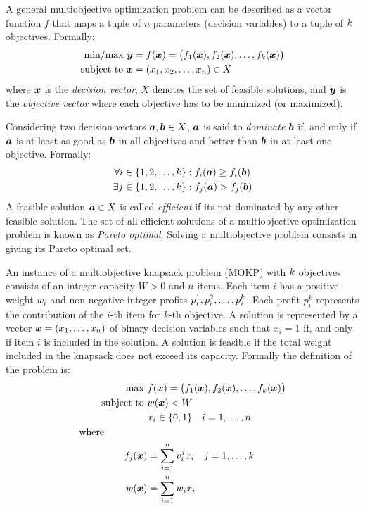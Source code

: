 A general multiobjective optimization problem can be described as a vector
function $f$ that maps a tuple of $n$ parameters (decision variables) to a tuple
of $k$ objectives.
Formally:
\begin{align*}
  \text{min/max} ~ \boldsymbol{y} &= f(\boldsymbol{x}) = 
    \big(f_1(\boldsymbol{x})
    ,f_2(\boldsymbol{x})
    ,\ldots
    ,f_{k}(\boldsymbol{x})\big) \\
  \text{subject to} ~ \boldsymbol{x} & = (x_1, x_2, \ldots, x_n) \in X
\end{align*}
where $\boldsymbol{x}$ is the \emph{decision vector}, $X$ denotes the set
of feasible solutions, and $\boldsymbol{y}$ is the \emph{objective vector} where
each objective has to be minimized (or maximized).

Considering two decision vectors $\boldsymbol{a}, \boldsymbol{b} \in X$, $\boldsymbol{a}$ is said to
\emph{dominate} $\boldsymbol{b}$ if, and only if $\boldsymbol{a}$ is at least as good as $\boldsymbol{b}$
in all objectives and better than $\boldsymbol{b}$ in at least one objective.
Formally:
\begin{align*}
    \forall i &\in \{1, 2, \ldots, k\}: f_i(\boldsymbol{a}) \geq f_i(\boldsymbol{b}) \\
    \exists j &\in \{1, 2, \ldots, k\}: f_j(\boldsymbol{a}) > f_j(\boldsymbol{b})
\end{align*}
A feasible solution $\boldsymbol{a} \in X$ is called \emph{efficient} %
if its not dominated by any other feasible solution.
The set of all efficient solutions of a multiobjective optimization problem is
known as \emph{Pareto optimal}.
Solving a multiobjective problem consists in giving its Pareto optimal set.

An instance of a multiobjective knapsack problem (MOKP) with $k$
objectives consists of an integer capacity $W > 0$ and $n$ items.
Each item $i$ has a positive weight $w_i$ and non negative integer
profits $p_i^1, p_i^2, \ldots, p_{i}^{k}$.
Each profit $p_i^k$ represents the contribution of the $i$-th item for $k$-th objective.
A solution is represented by a vector $\boldsymbol{x} = (x_1, \ldots, x_n)$ of binary
decision variables such that $x_i = 1$ if, and only if item $i$ is included in the
solution.
A solution is feasible if the total weight included in the knapsack does
not exceed its capacity.
Formally the definition of the problem is:
\begin{align*}
    \text{max   } & f(\boldsymbol{x}) = 
      \big(f_1(\boldsymbol{x}) ,f_2(\boldsymbol{x}) ,\ldots ,f_{k}(\boldsymbol{x})\big) \\
    \text{subject to   } & w(\boldsymbol{x}) < W \\
    & x_{i} \in \{0, 1\} \quad i = 1, \ldots, n \\
    \text{where} \phantom{mmmmm} \\
    f_j(\boldsymbol{x}) &= \sum_{i=1}^{n} v^j_i x_i \quad j = 1, \ldots, k \\
    w(\boldsymbol{x}) &= \sum_{i=1}^{n} w_i x_i
\end{align*}


